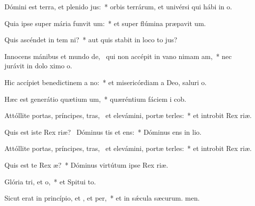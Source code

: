 \item Dómini est terra, et plenido jus:~* orbis terrárum, et univérsi qui hábi in o.
\item Quia ipse super mária funvit um:~* et super flúmina præpavit um.
\item Quis ascéndet in tem ni?~* aut quis stabit in loco to jus?
\item Innocens mánibus et mundo de,~\pscross{} qui non accépit in vano nimam am,~* nec jurávit in dolo ximo o.
\item Hic accípiet benedictinem a no:~* et misericórdiam a Deo, saluri o.
\item Hæc est generátio quætium um,~* quæréntium fáciem i cob.
\item Attóllite portas, príncipes, tras,~\pscross{} et elevámini, portæ terles:~* et introbit Rex riæ.
\item Quis est iste Rex riæ?~\pscross{} Dóminus tis et ens:~* Dóminus ens in lio.
\item Attóllite portas, príncipes, tras,~\pscross{} et elevámini, portæ terles:~* et introbit Rex riæ.
\item Quis est te Rex æ?~* Dóminus virtútum ipse  Rex riæ.
\item Glória tri, et o,~* et Spitui to.
\item Sicut erat in princípio, et , et per,~* et in sǽcula sæcurum. men.
